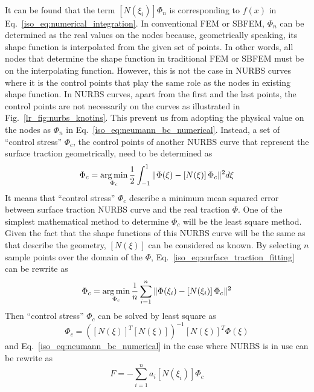 \paragraph{}
It can be found that the term $[N(\xi_i)] \Phi_n$ is corresponding to $f(x)$ in Eq.~\ref{iso_eq:numerical_integration}.
In conventional FEM or SBFEM, $\Phi_n$ can be determined as the real values on the nodes because, geometrically speaking, its shape function is interpolated from the given set of points.
In other words, all nodes that determine the shape function in traditional FEM or SBFEM must be on the interpolating function.
However, this is not the case in NURBS curves where it is the control points that play the same role as the nodes in existing shape function.
In NURBS curves, apart from the first and the last points, the control points are not necessarily on the curves as illustrated in Fig.~\ref{lr_fig:nurbs_knotins}.
This prevent us from adopting the physical value on the nodes as $\Phi_n$ in Eq.~\ref{iso_eq:neumann_bc_numerical}.
Instead, a set of ``control stress'' $\Phi_c$, the control points of another NURBS curve that represent the surface traction geometrically, need to be determined as 
    \begin{equation}
        \Phi_c = \operatorname*{arg\,min}_{\Phi_c}
            \frac{1}{2}
            \int_{-1}^1
            \|
                \Phi(\xi)-
                    \left[ N(\xi) \right]
                    \Phi_c
            \|^2
            d\xi            
    \label{iso_eq:surface_traction_fitting}
    \end{equation}
%
It means that ``control stress'' $\Phi_c$ describe a minimum mean squared error between surface traction NURBS curve and the real traction $\Phi$.
One of the simplest mathematical method to determine $\Phi_c$ will be the least square method.
Given the fact that the shape functions of this NURBS curve will be the same as that describe the geometry, $\left[ N(\xi) \right]$ can be considered as known.
By selecting $n$ sample points over the domain of the $\Phi$, Eq.~\ref{iso_eq:surface_traction_fitting} can be rewrite as
    \begin{equation}
        \Phi_c = \operatorname*{arg\,min}_{\Phi_c}
            \frac{1}{n}
            \sum_{i=1}^n
            \|
                \Phi(\xi_i)-
                    \left[ N(\xi_i) \right]
                    \Phi_c
            \|^2
    \label{iso_eq:surface_traction_fitting_discrete}
    \end{equation}
Then ``control stress'' $\Phi_c$ can be solved by least square as
    \begin{equation}
        \Phi_c= \left(
            \left[ N(\xi) \right] ^T
            \left[ N(\xi) \right]
        \right)^{-1}
        \left[ N(\xi) \right]^T
        \Phi(\xi)
    \end{equation}
and Eq.~\ref{iso_eq:neumann_bc_numerical} in the case where NURBS is in use can be rewrite as
    \begin{equation}
        {F}=-\sum_{i=1}^n
        a_i
        [N(\xi_i)]
        \Phi_c
    \label{iso_eq:neumann_bc_numerical_NURBS}
    \end{equation}
